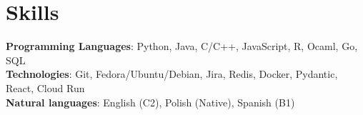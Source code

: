 \documentclass[letterpaper,11pt]{article}
\begin{document}
\section{Skills}
\begin{itemize}[leftmargin=0.15in, label={}]
  \small{\item{
                \textbf{Programming Languages}{: Python, Java, C/C++, JavaScript, R,  Ocaml, Go, SQL} \\
                \textbf{Technologies}{: Git, Fedora/Ubuntu/Debian, Jira, Redis, Docker, Pydantic, React, Cloud Run} \\
                \textbf{Natural languages}{: English (C2), Polish (Native), Spanish (B1) } \\
          }}
\end{itemize}
\vspace{-16pt}
\end{document}
